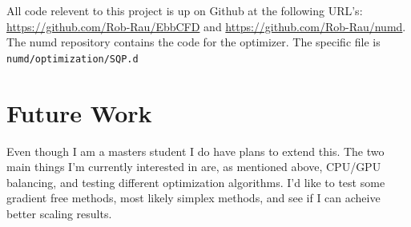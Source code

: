 \documentclass[12pt,parskip=full]{article}
\numberwithin{subsection}{section}
\begin{document}
		All code relevent to this project is up on Github at the following URL's: \url{https://github.com/Rob-Rau/EbbCFD} and \url{https://github.com/Rob-Rau/numd}.
		The numd repository contains the code for the optimizer. The specific file is \verb|numd/optimization/SQP.d|
	\section{Future Work}
		Even though I am a masters student I do have plans to extend this. The two main things I'm currently interested in are, as mentioned above, CPU/GPU
		balancing, and testing different optimization algorithms. I'd like to test some gradient free methods, most likely simplex methods, and see if I
		can acheive better scaling results. 
\end{document}
